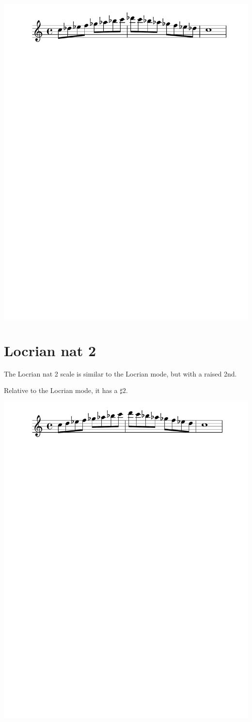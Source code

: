 \documentclass[11pt]{article}
\begin{document}
\begin{center}
\includegraphics[width=.9\linewidth]{c_locrian.pdf}
\end{center}

\section*{Locrian nat 2}
\label{sec:orgce24e4d}

The Locrian nat 2 scale is similar to the Locrian mode, but with a raised 2nd.

Relative to the Locrian mode, it has a \(\sharp{2}\).


\begin{center}
\includegraphics[width=.9\linewidth]{c_locrian_nat_2.pdf}
\end{center}
\end{document}
